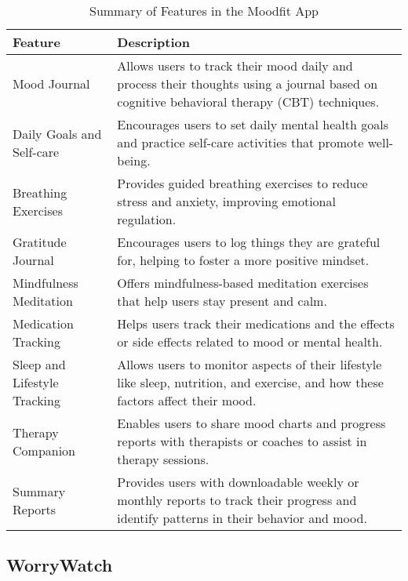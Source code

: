 \FloatBarrier
\begin{table}[ht]
\centering
\begin{tabular}{|p{4cm}|p{10cm}|}
\hline
\textbf{Feature} & \textbf{Description} \\ \hline
Mood Journal & Allows users to track their mood daily and process their thoughts using a journal based on cognitive behavioral therapy (CBT) techniques. \\ \hline
Daily Goals and Self-care & Encourages users to set daily mental health goals and practice self-care activities that promote well-being. \\ \hline
Breathing Exercises & Provides guided breathing exercises to reduce stress and anxiety, improving emotional regulation. \\ \hline
Gratitude Journal & Encourages users to log things they are grateful for, helping to foster a more positive mindset. \\ \hline
Mindfulness Meditation & Offers mindfulness-based meditation exercises that help users stay present and calm. \\ \hline
Medication Tracking & Helps users track their medications and the effects or side effects related to mood or mental health. \\ \hline
Sleep and Lifestyle Tracking & Allows users to monitor aspects of their lifestyle like sleep, nutrition, and exercise, and how these factors affect their mood. \\ \hline
Therapy Companion & Enables users to share mood charts and progress reports with therapists or coaches to assist in therapy sessions. \\ \hline
Summary Reports & Provides users with downloadable weekly or monthly reports to track their progress and identify patterns in their behavior and mood. \\ \hline
\end{tabular}
\caption{Summary of Features in the Moodfit App}
\label{tab:moodfit_features}
\end{table}
\FloatBarrier

\subsection{WorryWatch}


